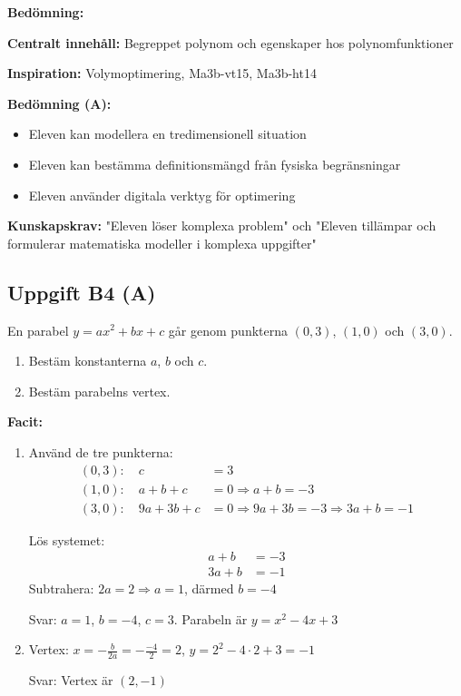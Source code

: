 \documentclass[12pt]{article}
\begin{document}
\begin{refbox}
\textbf{Bedömning:}

\textbf{Centralt innehåll:} Begreppet polynom och egenskaper hos polynomfunktioner

\textbf{Inspiration:} Volymoptimering, Ma3b-vt15, Ma3b-ht14

\textbf{Bedömning (A):}
\begin{itemize}
    \item Eleven kan modellera en tredimensionell situation
    \item Eleven kan bestämma definitionsmängd från fysiska begränsningar
    \item Eleven använder digitala verktyg för optimering
\end{itemize}

\textbf{Kunskapskrav:} "Eleven löser komplexa problem" och "Eleven tillämpar och formulerar matematiska modeller i komplexa uppgifter"
\end{refbox}

\subsection*{Uppgift B4 (A)}
En parabel $y = ax^2 + bx + c$ går genom punkterna $(0, 3)$, $(1, 0)$ och $(3, 0)$.
\begin{enumerate}[label=\alph*)]
    \item Bestäm konstanterna $a$, $b$ och $c$.
    \item Bestäm parabelns vertex.
\end{enumerate}

\begin{facitbox}
\textbf{Facit:}

\begin{enumerate}[label=\alph*)]
    \item Använd de tre punkterna:
    \begin{align*}
    (0, 3): \quad c &= 3 \\
    (1, 0): \quad a + b + c &= 0 \Rightarrow a + b = -3 \\
    (3, 0): \quad 9a + 3b + c &= 0 \Rightarrow 9a + 3b = -3 \Rightarrow 3a + b = -1
    \end{align*}
    
    Lös systemet:
    \begin{align*}
    a + b &= -3 \\
    3a + b &= -1
    \end{align*}
    Subtrahera: $2a = 2 \Rightarrow a = 1$, därmed $b = -4$
    
    Svar: $a = 1$, $b = -4$, $c = 3$. Parabeln är $y = x^2 - 4x + 3$
    
    \item Vertex: $x = -\frac{b}{2a} = -\frac{-4}{2} = 2$, $y = 2^2 - 4 \cdot 2 + 3 = -1$
    
    Svar: Vertex är $(2, -1)$
\end{enumerate}
\end{facitbox}
\end{document}
